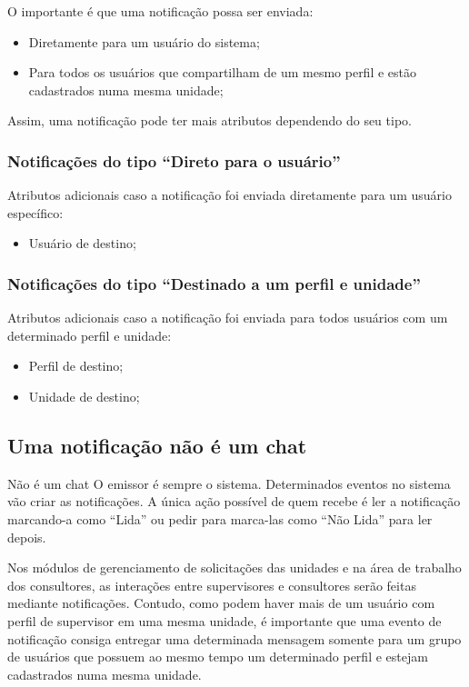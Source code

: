 O importante é que uma notificação possa ser enviada:
\begin{itemize}
	\item Diretamente para um usuário do sistema;
	\item Para todos os usuários que compartilham de um mesmo perfil e estão cadastrados numa mesma unidade;
\end{itemize}

Assim, uma notificação pode ter mais atributos dependendo do seu tipo.

\subsubsection{Notificações do tipo ``Direto para o usuário''}

Atributos adicionais caso a notificação foi enviada diretamente para um usuário específico:
\begin{itemize}
	\item Usuário de destino;
\end{itemize}

\subsubsection{Notificações do tipo ``Destinado a um perfil e unidade''}

Atributos adicionais caso a notificação foi enviada para todos usuários com um determinado perfil e unidade:
\begin{itemize}
	\item Perfil de destino;
	\item Unidade de destino;
\end{itemize}

\subsection{Uma notificação não é um chat}

\begin{importante}{Não é um chat}
	O emissor é sempre o sistema. Determinados eventos no sistema vão criar as notificações. A única ação possível de quem recebe é ler a notificação marcando-a como ``Lida'' ou pedir para marca-las como ``Não Lida'' para ler depois.
\end{importante}


Nos módulos de gerenciamento de solicitações das unidades e na área de trabalho dos consultores, as interações entre supervisores e consultores serão feitas mediante notificações. Contudo, como podem haver mais de um usuário com perfil de supervisor em uma mesma unidade, é importante que uma evento de notificação consiga entregar uma determinada mensagem somente para um grupo de usuários que possuem ao mesmo tempo um determinado perfil e estejam cadastrados numa mesma unidade.


